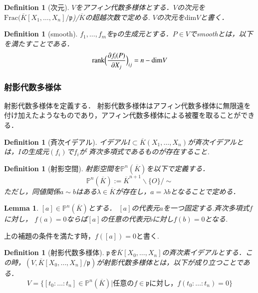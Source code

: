 \documentclass{ujarticle}
\newtheorem{dfn}[thm]{Definition}
\newtheorem{lem}[thm]{Lemma}
\begin{document}
\begin{dfn}[次元]
$V$をアフィン代数多様体とする．$V$の次元を$\mathrm{Frac}(\overline{K}[X_1,\dots,X_n]/\mathfrak{p}$)/$\overline{K}$の超越次数で定める.
$V$の次元を$\mathrm{dim}V$と書く．
\end{dfn}

\begin{dfn}[smooth]
  $f_1,\dots,f_m$を$\mathfrak{p}$の生成元とする．$P \in V$でsmoothとは，以下を満たすことである．
  \begin{equation*}
    \mathrm{rank}\Bigl(\frac{ \partial f_i(P)}{ \partial X_j} \Bigr)_{ij} = n - \mathrm{dim}V
  \end{equation*}
\end{dfn}

\subsubsection{射影代数多様体}
\label{subs:射影代数多様体}

射影代数多様体を定義する．
射影代数多様体はアフィン代数多様体に無限遠を付け加えたようなものであり，アフィン代数多様体による被覆を取ることができる．
\begin{dfn}[斉次イデアル]
イデアル$I\subset \overline{K}(X_1,\dots,X_n)$が斉次イデアルとは，$I$の生成元$(f_i)$で$f_i$が
斉次多項式であるものが存在すること.
\end{dfn}

\begin{dfn}[射影空間]
射影空間を$\mathbb{P}^n(\overline{K})$を以下で定義する．
\begin{equation*}
 \mathbb{P}^n(\overline{K}):=\overline{K}^{n+1}\backslash\{O\}/\sim
\end{equation*}
ただし，同値関係$a \sim b$はある$\lambda \in \overline{K}$が存在し，$a= \lambda b$となることで定める．
\end{dfn}

\begin{lem}
 $[a] \in \mathbb{P}^n(\overline{K})$とする． $[a]$の代表元$a$を一つ固定する.斉次多項式$f$に対し，
 $f(a)=0$ならば$[a]$の任意の代表元$b$に対し$f(b)=0$となる.
\end{lem}

上の補題の条件を満たす時，$f([a])=0$と書く.

\begin{dfn}[射影代数多様体]
  $\mathfrak{p}$を$\overline{K}[X_0,\dots,X_n]$の斉次素イデアルとする．この時，$(V,\overline{K}[X_0,\dots,X_n]/\mathfrak{p})$が射影代数多様体とは，以下が成り立つことである．
  \begin{equation*}
   V=\{[t_0:\dots:t_n] \in \mathbb{P}^n(\overline{K}) |   \mbox{任意の}f \in \mathfrak{p} \mbox{に対し，}f(t_0: \dots :t_n)=0\}
  \end{equation*}
\end{dfn}
\end{document}
